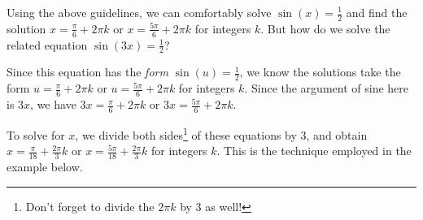 \documentclass{ximera}
\begin{document}
Using the above guidelines, we can comfortably solve $\sin(x) = \frac{1}{2}$ and find the solution $x = \frac{\pi}{6} + 2\pi k$ or $x = \frac{5\pi}{6} + 2\pi k$ for integers $k$.  But how do we solve the related equation $\sin(3x) = \frac{1}{2}$?

\smallskip

 Since this equation has the \textit{form} $\sin(u) = \frac{1}{2}$, we know the solutions take the form  $u= \frac{\pi}{6} + 2\pi k$ or $u = \frac{5\pi}{6} + 2\pi k$ for integers $k$. Since the argument of sine here is $3x$, we have $3x= \frac{\pi}{6} + 2\pi k$ or $3x = \frac{5\pi}{6} + 2\pi k$.
 
 \smallskip
 
 To solve for $x$, we divide both sides\footnote{Don't forget to divide the $2\pi k$ by $3$ as well!} of these equations by $3$, and obtain $x = \frac{\pi}{18} + \frac{2\pi}{3} k$ or $x = \frac{5\pi}{18} + \frac{2\pi}{3}k$ for integers $k$.  This is the technique employed in the example below.
\end{document}
